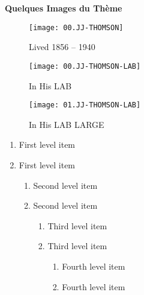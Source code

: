 \documentclass[../main.tex]{subfiles}
\begin{document}
\textbf{ Quelques Images du Thème}
    \begin{figure}[bh]
        \centering
        \texttt{[image: 00.JJ-THOMSON]} \caption{Lived 1856 – 1940} 
        \texttt{[image: 00.JJ-THOMSON-LAB]} 
        \caption{In His LAB}
        \texttt{[image: 01.JJ-THOMSON-LAB]} 
         \caption{In His LAB LARGE}
        \label{fig:img1}
        
    \end{figure}
    
    \begin{enumerate}
   \item First level item
   \item First level item
   \begin{enumerate}
     \item Second level item
     \item Second level item
     \begin{enumerate}
       \item Third level item
       \item Third level item
       \begin{enumerate}
         \item Fourth level item
         \item Fourth level item
       \end{enumerate}
     \end{enumerate}
   \end{enumerate}
 \end{enumerate}
    
    
\end{document}
